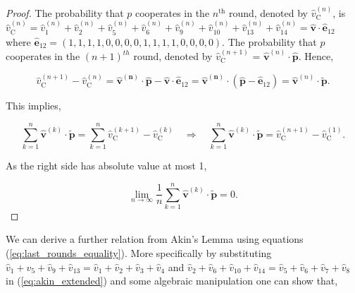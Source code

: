\documentclass{article}
\theoremstyle{definition}
\begin{document}
\begin{proof}
  The probability that \(p\) cooperates in the \(n^{\text{th}}\) round, denoted
  by \(\hat{v}_{\text{C}}^{(n)}\), is \(\hat{v}_{\text{C}}^{(n)} = \hat{v}_{1}^{(n)} +
  \hat{v}_{2}^{(n)} + \hat{v}_{5}^{(n)} + \hat{v}_{6}^{(n)} + \hat{v}_{9}^{(n)} +  \hat{v}_{10}^{(n)} +
  \hat{v}_{13}^{(n)} + \hat{v}_{14}^{(n)} = \mathbf{\hat{v}} \cdot \mathbf{\hat{e}}_{1 2}\)
  where \(\mathbf{\hat{e}}_{1 2} = (1, 1, 1, 1, \allowbreak 0,
  0, 0, 0, 1, 1, 1, 1, 0, 0, 0, 0)\). The probability that \(p\) cooperates in the \((n + 1)^{th}\) round, denoted
  by \(\hat{v}_{\text{C}}^{(n + 1)}\) = \(\mathbf{\hat{v}}^{(n)} \cdot \mathbf{\hat{p}}\).
  Hence,

  \begin{equation*}
   \hat{v}_{\text{C}}^{(n + 1)} - \hat{v}_{\text{C}}^{(n)} = \mathbf{\hat{v}^{(n)}} \cdot \mathbf{\hat{p}} - \mathbf{\hat{v}} \cdot \mathbf{\hat{e}}_{1 2}
    = \mathbf{\hat{v}^{(n)}} \cdot (\mathbf{\hat{p}} - \mathbf{\hat{e}}_{1 2}) = \mathbf{\hat{v}}^{(n)} \cdot \mathbf{\tilde{p}}.
  \end{equation*}

  This implies,

  \begin{equation}
    \sum^{n}_{k=1} \mathbf{\hat{v}}^{(k)} \cdot \mathbf{\tilde{p}} = \sum^{n}_{k=1} \hat{v}_{\text{C}}^{(k + 1)} - \hat{v}_{\text{C}}^{(k)} \quad \Rightarrow \quad \sum^{n}_{k=1} \mathbf{\hat{v}}^{(k)} \cdot \mathbf{\tilde{p}} =  \hat{v}_{\text{C}}^{(n + 1)} - \hat{v}_{\text{C}}^{(1)}.
   \end{equation}

   As the right side has absolute value at most 1,

   \begin{equation}
    \lim_{n \rightarrow \infty} \frac{1}{n} \sum^{n}_{k=1} \mathbf{\hat{v}}^{(k)} \cdot \mathbf{\tilde{p}} = 0. 
   \end{equation}

\end{proof}

We can derive a further relation from Akin's Lemma using equations
(\ref{eq:last_rounds_equality}). More specifically by substituting \(\hat{v}_{1} +
\hat{v}_{5} + \hat{v}_{9} + \hat{v}_{13} = \hat{v}_{1} +
\hat{v}_{2} + \hat{v}_{3} + \hat{v}_{4} \) and \(\hat{v}_{2} + \hat{v}_{6} + \hat{v}_{10} + \hat{v}_{14} =
\hat{v}_{5} + \hat{v}_{6} + \hat{v}_{7} + \hat{v}_{8} \) in (\ref{eq:akin_extended}) and some
algebraic manipulation one can show that,
\end{document}

